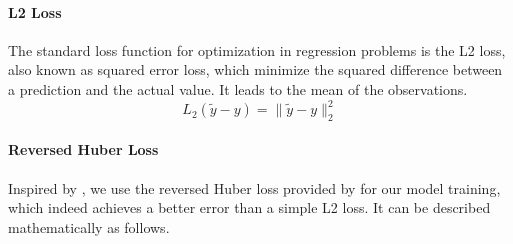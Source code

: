 \paragraph{L2 Loss}
The standard loss function for optimization in regression problems is the L2 loss, also known as squared error loss, which minimize the squared difference between a prediction and the actual value. It leads to the mean of the observations. 
\[ L_2(\tilde y - y) = \|\tilde y - y \|_2^2 \]


%
%


\paragraph{Reversed Huber Loss}
Inspired by \cite{img2depth}, we use the reversed Huber loss provided by \cite{berhu-loss} for our model training, which indeed achieves a better error than a simple L2 loss. It can be described mathematically as follows.


